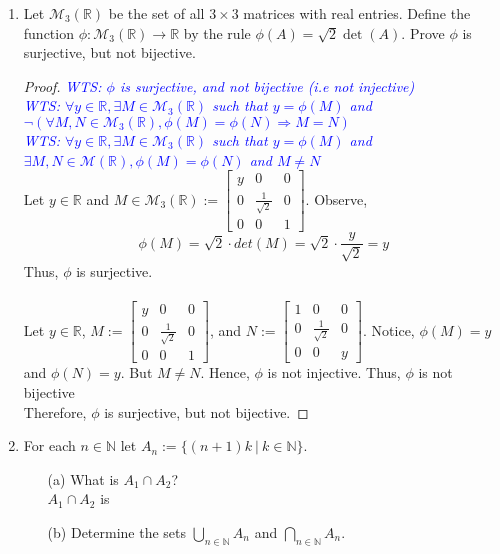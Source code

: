 \documentclass[12pt]{article}
\newcommand{\R}{\mathbb{R}}
\newcommand{\wts}[1]{\textit{\textcolor{blue}{WTS: #1}}\\}
\begin{document}
\begin{enumerate}
\item Let $\mathcal{M}_3(\R)$ be the set of all $3 \times 3$ matrices with real entries. Define the function $\phi : \mathcal{M}_3(\R) \to \mathbb{R}$ by the rule $\phi(A) = \sqrt{2} \det(A)$. Prove $\phi$ is surjective, but not bijective.
\begin{proof}
	\wts{$ \phi $ is surjective, and not bijective (i.e not injective)}
	\wts{$\forall y\in \R,\exists M\in\mathcal{M}_3(\R)$ such that $ y=\phi(M) $ and $ \neg (\forall M,N\in\mathcal{M}_3(\R),\phi(M)=\phi(N)\Rightarrow M=N)$}
	\wts{$\forall y\in \R,\exists M\in\mathcal{M}_3(\R)$ such that $ y=\phi(M) $ and $\exists M,N\in\mathcal{M}(\R),\phi(M)=\phi(N) $ and $ M \neq N $}
	Let $ y\in\R $ and $ M\in\mathcal{M}_3(\R) := \begin{bmatrix}
	y & 0 & 0 \\ 
	0 & \frac{1}{\sqrt{2}} & 0\\ 
	0 & 0 & 1
	\end{bmatrix} $. Observe, 
		\[ \phi(M) = \sqrt{2}\cdot det(M) = \sqrt{2}\cdot \frac{y}{\sqrt{2}} = y \]
	Thus, $ \phi $ is surjective.\\
	\\
	Let $y\in\R$, $ M := \begin{bmatrix}
	y & 0 & 0 \\ 
	0 & \frac{1}{\sqrt{2}} & 0\\ 
	0 & 0 & 1
	\end{bmatrix} $, and $ N:= \begin{bmatrix}
	1 & 0 & 0 \\ 
	0 & \frac{1}{\sqrt{2}} & 0\\ 
	0 & 0 & y
	\end{bmatrix} $. Notice, $ \phi(M) = y $ and $ \phi(N)=y $. But $ M \neq N $. Hence, $ \phi  $ is not injective. Thus, $ \phi $ is not bijective\\
	Therefore, $ \phi $ is surjective, but not bijective.
\end{proof}
\item For each $n \in \mathbb{N}$ let $A_n := \{  (n+1)k ~|~ k \in \mathbb{N} \}$. 
\begin{itemize}
    \item[(a)] What is $A_1 \cap A_2$? \\
    $ A_1 \cap A_2 $ is 
    \item[(b)] Determine the sets $\bigcup_{n \in \mathbb{N}} A_n$ and $\bigcap_{n \in \mathbb{N}} A_n$.
\end{itemize}   

\newpage
    

\end{enumerate}
\end{document}
